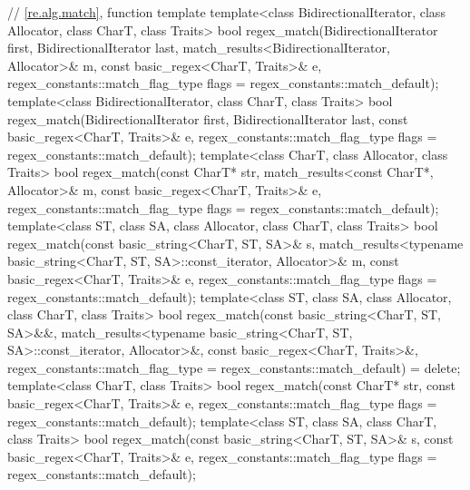\begin{codeblock}
{  // \ref{re.alg.match}, function template 
  template<class BidirectionalIterator, class Allocator, class CharT, class Traits>
    bool regex_match(BidirectionalIterator first, BidirectionalIterator last,
                     match_results<BidirectionalIterator, Allocator>& m,
                     const basic_regex<CharT, Traits>& e,
                     regex_constants::match_flag_type flags = regex_constants::match_default);
  template<class BidirectionalIterator, class CharT, class Traits>
    bool regex_match(BidirectionalIterator first, BidirectionalIterator last,
                     const basic_regex<CharT, Traits>& e,
                     regex_constants::match_flag_type flags = regex_constants::match_default);
  template<class CharT, class Allocator, class Traits>
    bool regex_match(const CharT* str, match_results<const CharT*, Allocator>& m,
                     const basic_regex<CharT, Traits>& e,
                     regex_constants::match_flag_type flags = regex_constants::match_default);
  template<class ST, class SA, class Allocator, class CharT, class Traits>
    bool regex_match(const basic_string<CharT, ST, SA>& s,
                     match_results<typename basic_string<CharT, ST, SA>::const_iterator,
                                   Allocator>& m,
                     const basic_regex<CharT, Traits>& e,
                     regex_constants::match_flag_type flags = regex_constants::match_default);
  template<class ST, class SA, class Allocator, class CharT, class Traits>
    bool regex_match(const basic_string<CharT, ST, SA>&&,
                     match_results<typename basic_string<CharT, ST, SA>::const_iterator,
                                   Allocator>&,
                     const basic_regex<CharT, Traits>&,
                     regex_constants::match_flag_type = regex_constants::match_default) = delete;
  template<class CharT, class Traits>
    bool regex_match(const CharT* str,
                     const basic_regex<CharT, Traits>& e,
                     regex_constants::match_flag_type flags = regex_constants::match_default);
  template<class ST, class SA, class CharT, class Traits>
    bool regex_match(const basic_string<CharT, ST, SA>& s,
                     const basic_regex<CharT, Traits>& e,
                     regex_constants::match_flag_type flags = regex_constants::match_default);

}
\end{codeblock}
